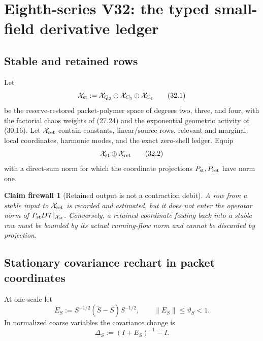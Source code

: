 \documentclass[11pt,oneside]{book}
\newtheorem{firewall}[theorem]{Claim firewall}
\theoremstyle{definition}
\theoremstyle{remark}
\begin{document}


\section{Eighth-series V32: the typed small-field derivative ledger}

\subsection{Stable and retained rows}

Let
\[
 {\cal X}_{\rm st}:=
 {\cal X}_{Q_2}\oplus{\cal X}_{C_3}\oplus{\cal X}_{C_4}           \tag{32.1}
\]
be the reserve-restored packet-polymer space of degrees two, three,
and four, with the factorial chaos weights of (27.24) and the
exponential geometric activity of (30.16).  Let
\({\cal X}_{\rm ret}\) contain constants, linear/source rows,
relevant and marginal local coordinates, harmonic modes, and the
exact zero-shell ledger.  Equip
\[
                         {\cal X}_{\rm st}\oplus{\cal X}_{\rm ret}
                                                                    \tag{32.2}
\]
with a direct-sum norm for which the coordinate projections
\(P_{\rm st},P_{\rm ret}\) have norm one.

\begin{firewall}[Retained output is not a contraction debit]
\label{fire:e8v32-retained}
A row from a stable input to \({\cal X}_{\rm ret}\) is recorded and
estimated, but it does not enter the operator norm of
\(P_{\rm st}D{\cal T}|_{{\cal X}_{\rm st}}\).  Conversely, a retained
coordinate feeding back into a stable row must be bounded by its
actual running-flow norm and cannot be discarded by projection.
\end{firewall}

\subsection{Stationary covariance rechart in packet coordinates}

At one scale let
\[
 E_S:=S^{-1/2}(\widetilde S-S)S^{-1/2},\qquad
 \|E_S\|\leq\vartheta_S<1.                                      \tag{32.3}
\]
In normalized coarse variables the covariance change is
\[
 \Delta_S:=(I+E_S)^{-1}-I.                                      \tag{32.4}
\]
\end{document}
